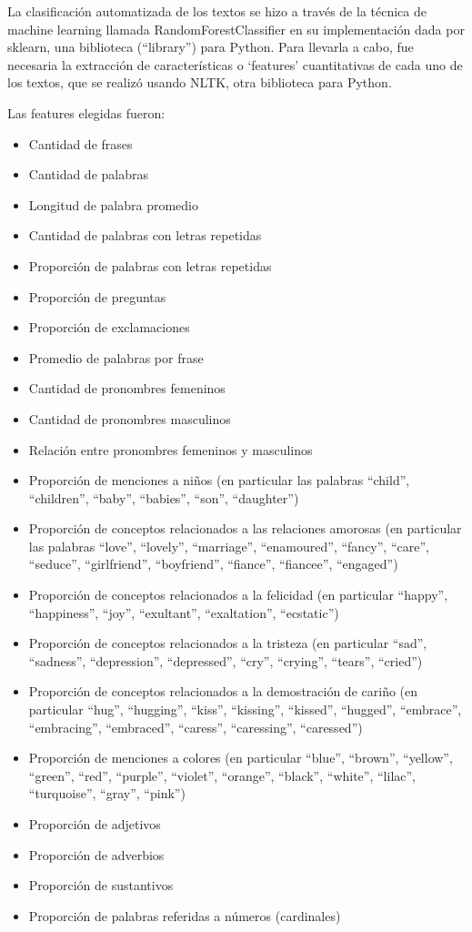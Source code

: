 \documentclass[
journal=jacsat, %
manuscript=article]{achemso}
\begin{document}
La clasificación automatizada de los textos se hizo a través de la técnica de machine learning llamada RandomForestClassifier en su implementación dada por sklearn, una biblioteca (“library”) para Python. Para llevarla a cabo, fue necesaria la extracción de características o ‘features’ cuantitativas de cada uno de los textos, que se realizó usando NLTK, otra biblioteca para Python.

Las features elegidas fueron:
\begin{itemize}
\item Cantidad de frases
\item Cantidad de palabras
\item Longitud de palabra promedio
\item Cantidad de palabras con letras repetidas
\item Proporción de palabras con letras repetidas
\item Proporción de preguntas
\item Proporción de exclamaciones
\item Promedio de palabras por frase
\item Cantidad de pronombres femeninos
\item Cantidad de pronombres masculinos
\item Relación entre pronombres femeninos y masculinos
\item Proporción de menciones a niños (en particular las palabras “child”, “children”, “baby”, “babies”, “son”, “daughter”)
\item Proporción de conceptos relacionados a las relaciones amorosas (en particular las palabras “love”, “lovely”, “marriage”, “enamoured”, “fancy”, “care”, “seduce”, “girlfriend”, “boyfriend”, “fiance”, “fiancee”, “engaged”)
\item Proporción de conceptos relacionados a la felicidad (en particular “happy”, “happiness”, “joy”, “exultant”, “exaltation”, “ecstatic”)
\item Proporción de conceptos relacionados a la tristeza (en particular “sad”, “sadness”, “depression”, “depressed”, “cry”, “crying”, “tears”, “cried”)
\item Proporción de conceptos relacionados a la demostración de cariño (en particular “hug”, “hugging”, “kiss”, “kissing”, “kissed”, “hugged”, “embrace”, “embracing”, “embraced”, “caress”, “caressing”, “caressed”)
\item Proporción de menciones a colores (en particular “blue”, “brown”, “yellow”, “green”, “red”, “purple”, “violet”, “orange”, “black”, “white”, “lilac”, “turquoise”, “gray”, “pink”)
\item Proporción de adjetivos
\item Proporción de adverbios
\item Proporción de sustantivos
\item Proporción de palabras referidas a números (cardinales)
\end{itemize}
\end{document}
